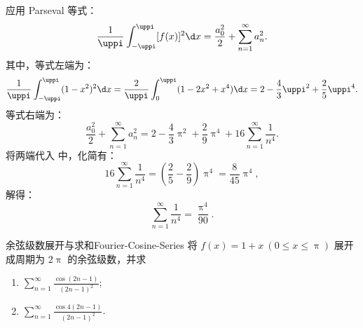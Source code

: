 \begin{solution}
    应用 Parseval 等式：
    \begin{equation}\label{eq:parseval}
        \frac{1}{\uppi} \int_{-\uppi}^{\uppi} [f(x)]^2 \d x = \frac{a_0^2}{2} + \sum_{n=1}^{\infty} a_n^2.
    \end{equation}
    其中，等式左端为：
    \begin{equation}
        \frac{1}{\uppi} \int_{-\uppi}^{\uppi} (1 - x^2)^2 \d x = \frac{2}{\uppi} \int_{0}^{\uppi} (1 - 2x^2 + x^4) \d x = 2 - \frac{4}{3}\uppi^2 + \frac{2}{5}\uppi^4.
    \end{equation}
    等式右端为：
    \begin{equation}
        \frac{a_0^2}{2} + \sum_{n=1}^{\infty} a_n^2 = 2 - \frac{4}{3}\uppi^2 + \frac{2}{9}\uppi^4 + 16 \sum_{n=1}^{\infty} \frac{1}{n^4}.
    \end{equation}
    将两端代入  中，化简有：
    \begin{equation}
        16 \sum_{n=1}^{\infty} \frac{1}{n^4} = \left( \frac{2}{5} - \frac{2}{9} \right) \uppi^4 = \frac{8}{45}\uppi^4,
    \end{equation}
    解得：
    \begin{equation}
        \boxed{\sum_{n=1}^{\infty} \frac{1}{n^4} = \frac{\uppi^4}{90}}.
    \end{equation}
\end{solution}

\begin{problem}{余弦级数展开与求和}{Fourier-Cosine-Series}
    将 $f(x) = 1 + x \ (0 \leqslant x \leqslant \uppi)$ 展开成周期为 $2\uppi$ 的余弦级数，并求
    \begin{enumerate}
        \item $\sum_{n=1}^{\infty} \frac{\cos(2n - 1)}{(2n - 1)^2}$;
        \item $\sum_{n=1}^{\infty} \frac{\cos 4(2n - 1)}{(2n - 1)^2}$.
    \end{enumerate}
\end{problem}

